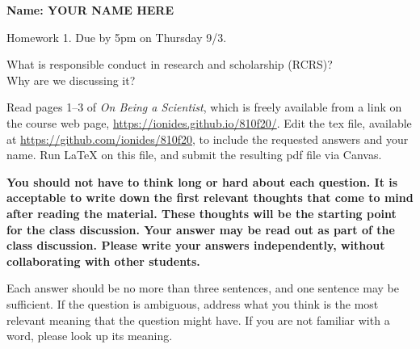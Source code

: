 \documentclass[12pt]{article}
\begin{document}
\begin{center}\bf 
Name: YOUR NAME HERE

Homework 1. Due by 5pm on Thursday 9/3.

What is responsible conduct in research and scholarship (RCRS)? \\
Why are we discussing it? 
\end{center}

Read pages 1--3 of {\em On Being a Scientist}, which is freely available from a link on the course web page, \url{https://ionides.github.io/810f20/}. Edit the tex file, available at \url{https://github.com/ionides/810f20}, to include the requested answers and your name. Run {\LaTeX} on this file, and submit the resulting pdf file via Canvas.

{\bf You should not have to think long or hard about each question. It is acceptable to write down the first relevant thoughts that come to mind after reading the material. These thoughts will be the starting point for the class discussion. Your answer may be read out as part of the class discussion. Please write your answers independently, without collaborating with other students.

Each answer should be no more than three sentences, and one sentence may be sufficient. If the question is ambiguous, address what you think is the most relevant meaning that the question might have. If you are not familiar with a word, please look up its meaning.

}
\end{document}
